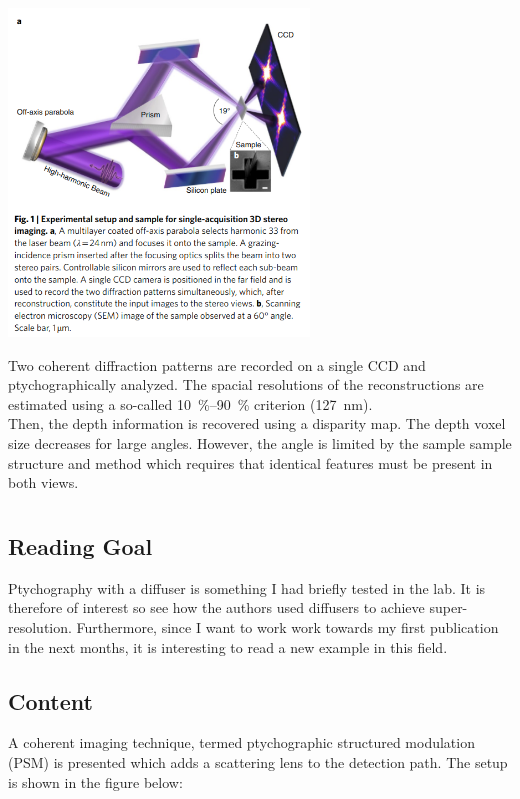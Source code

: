 \documentclass{article}
\newcommand{\newcite}[1] {\section{\cite{#1} \citenum{#1}}}
\begin{document}
\begin{center}
    \includegraphics[width=0.6\textwidth]{figures/stereoscope.png}
\end{center}
Two coherent diffraction patterns are recorded on a single CCD and ptychographically analyzed. The spacial resolutions of the reconstructions are estimated using a so-called \SIrange{10}{90}{\percent} criterion (\SI{127}{\nano\meter}).\\
Then, the depth information is recovered using a disparity map. The depth voxel size decreases for large angles. However, the angle is limited by the sample sample structure and method which requires that identical features must be present in both views.

\newcite{Song2019-fh}
\subsection*{Reading Goal}
Ptychography with a diffuser is something I had briefly tested in the lab. It is therefore of interest so see how the authors used diffusers to achieve super-resolution. Furthermore, since I want to work work towards my first publication in the next months, it is interesting to read a new example in this field.

\subsection*{Content}
A coherent imaging technique, termed ptychographic structured modulation (PSM) is presented which adds a scattering lens to the detection path. The setup is shown in the figure below: 
\end{document}
